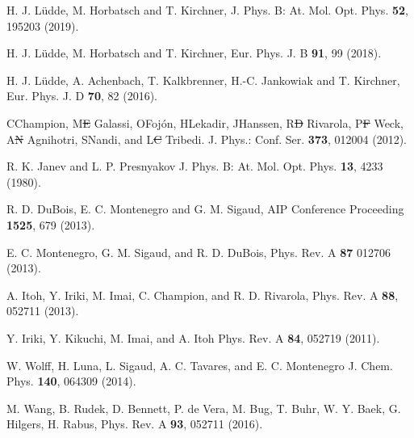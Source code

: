 \documentclass[10pt,showpacs,showkeys,twocolumn]{revtex4-1} %
\providecommand{\DIFadd}[1]{{\protect\color{blue}\uwave{#1}}} %
\providecommand{\DIFdel}[1]{{\protect\color{red}\sout{#1}}}                      %
\providecommand{\DIFaddbegin}{} %
\providecommand{\DIFaddend}{} %
\providecommand{\DIFdelbegin}{} %
\providecommand{\DIFdelend}{} %
\newcommand{\DIFscaledelfig}{0.5}
\newlength{\DIFdelgraphicswidth} %
\newlength{\DIFdelgraphicsheight} %
\newcommand{\DIFaddincludegraphics}[2][]{{\color{blue}\fbox{\DIFOincludegraphics[#1]{#2}}}} %
\newcommand{\DIFdelincludegraphics}[2][]{%
\sbox{\DIFdelgraphicsbox}{\DIFOincludegraphics[#1]{#2}}%
\settoboxwidth{\DIFdelgraphicswidth}{\DIFdelgraphicsbox} %
\settoboxtotalheight{\DIFdelgraphicsheight}{\DIFdelgraphicsbox} %
\scalebox{\DIFscaledelfig}{%
\parbox[b]{\DIFdelgraphicswidth}{\usebox{\DIFdelgraphicsbox}\\[-\baselineskip] \rule{\DIFdelgraphicswidth}{0em}}\llap{\resizebox{\DIFdelgraphicswidth}{\DIFdelgraphicsheight}{%
\setlength{\unitlength}{\DIFdelgraphicswidth}%
\begin{picture}(1,1)%
\thicklines\linethickness{2pt} %
{\color[rgb]{1,0,0}\put(0,0){\framebox(1,1){}}}%
{\color[rgb]{1,0,0}\put(0,0){\line( 1,1){1}}}%
{\color[rgb]{1,0,0}\put(0,1){\line(1,-1){1}}}%
\end{picture}%
}\hspace*{3pt}}} %
} %
\DeclareRobustCommand{\DIFaddbegin}{\DIFOaddbegin \let\includegraphics\DIFaddincludegraphics} %
\DeclareRobustCommand{\DIFaddend}{\DIFOaddend \let\includegraphics\DIFOincludegraphics} %
\DeclareRobustCommand{\DIFdelbegin}{\DIFOdelbegin \let\includegraphics\DIFdelincludegraphics} %
\DeclareRobustCommand{\DIFdelend}{\DIFOaddend \let\includegraphics\DIFOincludegraphics} %
\begin{document}
\begin{thebibliography}{}
H. J. L\"udde,  M. Horbatsch and T. Kirchner, 
J. Phys. B: At. Mol. Opt. Phys. \textbf{52}, 195203 (2019).

H. J. L\"udde, M. Horbatsch and T. Kirchner, 
Eur. Phys. J. B \textbf{91}, 99 (2018).

H. J. L\"udde, A. Achenbach, T. Kalkbrenner, H.-C. Jankowiak and T. Kirchner,
Eur. Phys. J. D \textbf{70}, 82 (2016).

C\DIFaddbegin \DIFadd{. }\DIFaddend Champion, M\DIFdelbegin \DIFdel{E }\DIFdelend \DIFaddbegin \DIFadd{. E. }\DIFaddend Galassi, O\DIFaddbegin \DIFadd{. }\DIFaddend Foj\'{o}n, H\DIFaddbegin \DIFadd{. }\DIFaddend Lekadir, J\DIFaddbegin \DIFadd{. }\DIFaddend Hanssen, 
R\DIFdelbegin \DIFdel{D }\DIFdelend \DIFaddbegin \DIFadd{. D. }\DIFaddend Rivarola, P\DIFdelbegin \DIFdel{F }\DIFdelend \DIFaddbegin \DIFadd{. F. }\DIFaddend Weck, A\DIFdelbegin \DIFdel{N }\DIFdelend \DIFaddbegin \DIFadd{. N. }\DIFaddend Agnihotri, S\DIFaddbegin \DIFadd{. }\DIFaddend Nandi, and L\DIFdelbegin \DIFdel{C }\DIFdelend \DIFaddbegin \DIFadd{. C. }\DIFaddend Tribedi. 
J. Phys.: Conf. Ser. \textbf{373}, 012004 (2012).


R. K. Janev and L. P. Presnyakov 
J. Phys. B: At. Mol. Opt. Phys.  \textbf{13}, 4233 (1980).

R. D. DuBois, E. C. Montenegro and G. M. Sigaud,
AIP Conference Proceeding \textbf{1525}, 679 (2013).

E. C. Montenegro, G. M. Sigaud, and R. D. DuBois, 
Phys. Rev. A \textbf{87} 012706 (2013).


A. Itoh, Y. Iriki, M. Imai, C. Champion, and R. D. Rivarola, 
Phys. Rev. A \textbf{88}, 052711 (2013).

Y. Iriki, Y. Kikuchi, M. Imai, and A. Itoh
Phys. Rev. A \textbf{84}, 052719 (2011). 


W. Wolff, H. Luna, L. Sigaud, A. C. Tavares, and E. C. Montenegro
J. Chem. Phys. \textbf{140}, 064309 (2014).

M. Wang, B. Rudek, D. Bennett, P. de Vera, M. Bug, T. Buhr, W. Y. Baek,
G. Hilgers, H. Rabus, 
Phys. Rev. A \textbf{93}, 052711 (2016).


\end{thebibliography}
\end{document}
